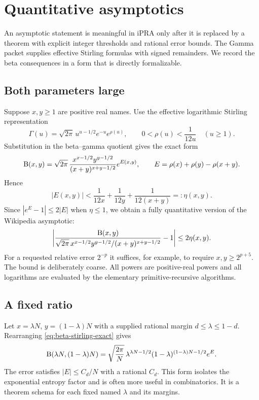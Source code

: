 \section{Quantitative asymptotics}
\label{sec:asymptotics}

An asymptotic statement is meaningful in iPRA only after it is replaced by a theorem with explicit integer thresholds and rational error bounds.  The Gamma packet supplies effective Stirling formulas with signed remainders.  We record the beta consequences in a form that is directly formalizable.

\subsection{Both parameters large}

Suppose $x,y\ge1$ are positive real names.  Use the effective logarithmic Stirling representation
\[
 \Gamma(u)=\sqrt{2\pi}\,
 u^{u-1/2}e^{-u}e^{\rho(u)},
 \qquad
 0<\rho(u)<\frac{1}{12u}
 \quad(u\ge1).
\]
Substitution in the beta--gamma quotient gives the exact form
\begin{equation}
 \mathrm B(x,y)=
 \sqrt{2\pi}\,
 \frac{x^{x-1/2}y^{y-1/2}}
      {(x+y)^{x+y-1/2}}
 e^{E(x,y)},
 \qquad
 E=\rho(x)+\rho(y)-\rho(x+y).
 \label{eq:beta-stirling-exact}
\end{equation}
Hence
\begin{equation}
 |E(x,y)|<
 \frac1{12x}+\frac1{12y}+\frac1{12(x+y)}
 =:\eta(x,y).
 \label{eq:beta-stirling-error}
\end{equation}
Since $|e^E-1|\le2|E|$ when $\eta\le1$, we obtain a fully quantitative version of the Wikipedia asymptotic:
\begin{equation}
 \left|
 \frac{\mathrm B(x,y)}
 {\sqrt{2\pi}\,
 x^{x-1/2}y^{y-1/2}/(x+y)^{x+y-1/2}}
 -1\right|
 \le2\eta(x,y).
 \label{eq:beta-stirling-relative}
\end{equation}
For a requested relative error $2^{-p}$ it suffices, for example, to require
$x,y\ge2^{p+5}$.  The bound is deliberately coarse.  All powers are positive-real powers and all logarithms are evaluated by the elementary primitive-recursive algorithms.

\subsection{A fixed ratio}

Let $x=\lambda N$, $y=(1-\lambda)N$ with a supplied rational margin
$d\le\lambda\le1-d$.  Rearranging \eqref{eq:beta-stirling-exact} gives
\[
 \mathrm B(\lambda N,(1-\lambda)N)
 =
 \sqrt{\frac{2\pi}{N}}\,
 \lambda^{\lambda N-1/2}
 (1-\lambda)^{(1-\lambda)N-1/2}
 e^{E}.
\]
The error satisfies $|E|\le C_d/N$ with a rational $C_d$.  This form isolates the exponential entropy factor and is often more useful in combinatorics.  It is a theorem schema for each fixed named $\lambda$ and its margins.

